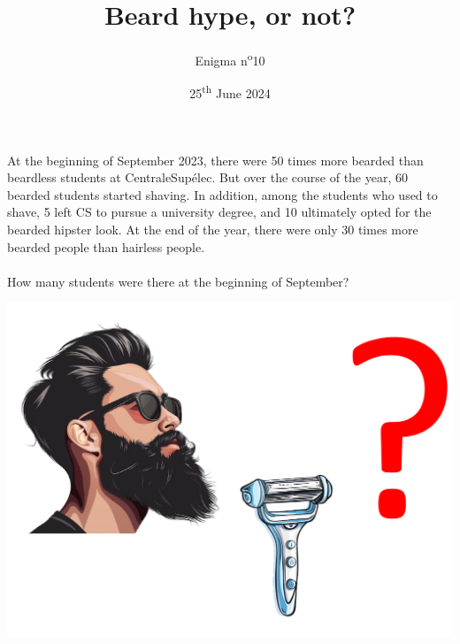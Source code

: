 \documentclass[a4paper, top=10mm]{article}
\title{\textbf{\huge{Beard hype, or not?}}}
\author{Enigma n\textsuperscript{o}10}
\date{25\textsuperscript{th} June 2024}
\begin{document}
	\maketitle
	
	\Large
	At the beginning of September 2023, there were 50 times more bearded than beardless students at CentraleSupélec.
	But over the course of the year, 60 bearded students started shaving.
	In addition, among the students who used to shave, 5 left CS to pursue a university degree, and 10 ultimately opted for the bearded hipster look.
	At the end of the year, there were only 30 times more bearded people than hairless people.\\
	\\
	How many students were there at the beginning of September?
	
	\vspace{2cm}
	
	\begin{center}
		\includegraphics[width=\linewidth]{10hype.pdf}
	\end{center}
	
	
\end{document}
